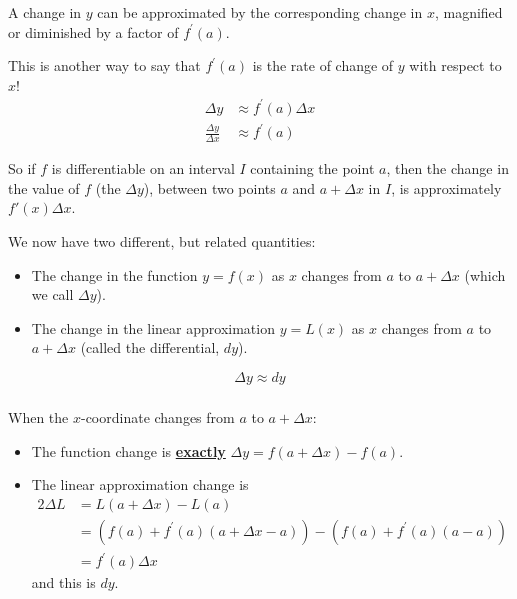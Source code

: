 \documentclass[14pt]{beamer}
\begin{document}
\begin{frame}
\footnotesize
A change in $y$ can be approximated by the corresponding change in $x$, magnified or diminished by a factor of $f^{\prime}(a)$.  

\vspace{1pc}
This is another way to say that $f^{\prime}(a)$ is the rate of change of $y$ with respect to $x$!
\begin{align*}
\Delta y & \approx f^{\prime}(a) \Delta x \\[0.5pc]
\frac{\Delta y}{\Delta x} & \approx f^{\prime}(a)
\end{align*}

\vspace{1pc}
So if $f$ is differentiable on an interval $I$ containing the point $a$, then the change in the value of $f$ (the $\Delta y$), between two points $a$ and $a+\Delta x$ in $I$, is \alert{approximately} $f'(x)\Delta x$. 
\end{frame}

\begin{frame}
\small
We now have two different, but related quantities:

\begin{itemize}
\item The change in the function $y=f(x)$ as $x$ changes from $a$ to $a+\Delta x$ (which we call $\Delta y$).

\vspace{0.5pc}
\item The change in the linear approximation $y=L(x)$ as $x$ changes from $a$ to $a+\Delta x$ (called the \alert{differential}, $dy$).
\end{itemize}

\[\Delta y \approx dy\]
\end{frame}

\begin{frame}
\frametitle{}
\small
When the $x$-coordinate changes from $a$ to $a+\Delta x$:
\begin{itemize}
\item The function change is \underline{{\bf exactly}} $\Delta y=f(a+\Delta x)-f(a)$.
\item The linear approximation change is 
\begin{alignat*}{2}
\Delta L &= L(a+\Delta x)-L(a) \\[0.5pc]
&= \left( f(a)+f^{\prime}(a)(a+\Delta x -a) \right) - \left( f(a)+f^{\prime}(a)(a-a) \right) \\[0.5pc]
&= f^{\prime}(a) \Delta x
\end{alignat*}
and this is $dy$.
\end{itemize}
\end{frame}
\end{document}
